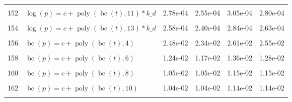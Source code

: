 \documentclass[12pt,a4paper]{article}
\DeclareMathOperator{\bc}{bc}
\DeclareMathOperator{\poly}{poly}
\begin{document}
\begin{longtable}[t]{ll>{\raggedleft\arraybackslash}p{2cm}>{\raggedleft\arraybackslash}p{2cm}>{\raggedleft\arraybackslash}p{2cm}>{\raggedleft\arraybackslash}p{2cm}}
\cellcolor{gray!6}{151} & \cellcolor{gray!6}{$\log(p) = c + \poly\left( \bc(t), 10 \right) * k\_d$} & \cellcolor{gray!6}{2.55e-04} & \cellcolor{gray!6}{2.34e-04} & \cellcolor{gray!6}{2.80e-04} & \cellcolor{gray!6}{2.56e-04}\\
152 & $\log(p) = c + \poly\left( \bc(t), 11 \right) * k\_d$ & 2.78e-04 & 2.55e-04 & 3.05e-04 & 2.80e-04\\
\cellcolor{gray!6}{153} & \cellcolor{gray!6}{$\log(p) = c + \poly\left( \bc(t), 12 \right) * k\_d$} & \cellcolor{gray!6}{2.88e-04} & \cellcolor{gray!6}{2.59e-04} & \cellcolor{gray!6}{3.17e-04} & \cellcolor{gray!6}{2.84e-04}\\
154 & $\log(p) = c + \poly\left( \bc(t), 13 \right) * k\_d$ & 2.58e-04 & 2.40e-04 & 2.84e-04 & 2.63e-04\\
\cellcolor{gray!6}{155} & \cellcolor{gray!6}{$\bc(p) = c + \poly\left( \bc(t), 3 \right)$} & \cellcolor{gray!6}{5.55e-02} & \cellcolor{gray!6}{2.01e-02} & \cellcolor{gray!6}{2.21e-02} & \cellcolor{gray!6}{2.12e-02}\\
156 & $\bc(p) = c + \poly\left( \bc(t), 4 \right)$ & 2.48e-02 & 2.34e-02 & 2.61e-02 & 2.55e-02\\
\cellcolor{gray!6}{157} & \cellcolor{gray!6}{$\bc(p) = c + \poly\left( \bc(t), 5 \right)$} & \cellcolor{gray!6}{1.38e-02} & \cellcolor{gray!6}{1.38e-02} & \cellcolor{gray!6}{1.43e-02} & \cellcolor{gray!6}{1.43e-02}\\
158 & $\bc(p) = c + \poly\left( \bc(t), 6 \right)$ & 1.24e-02 & 1.17e-02 & 1.36e-02 & 1.28e-02\\
\cellcolor{gray!6}{159} & \cellcolor{gray!6}{$\bc(p) = c + \poly\left( \bc(t), 7 \right)$} & \cellcolor{gray!6}{1.13e-02} & \cellcolor{gray!6}{1.08e-02} & \cellcolor{gray!6}{1.20e-02} & \cellcolor{gray!6}{1.18e-02}\\
160 & $\bc(p) = c + \poly\left( \bc(t), 8 \right)$ & 1.05e-02 & 1.05e-02 & 1.15e-02 & 1.15e-02\\
\cellcolor{gray!6}{161} & \cellcolor{gray!6}{$\bc(p) = c + \poly\left( \bc(t), 9 \right)$} & \cellcolor{gray!6}{1.06e-02} & \cellcolor{gray!6}{1.05e-02} & \cellcolor{gray!6}{1.16e-02} & \cellcolor{gray!6}{1.16e-02}\\
162 & $\bc(p) = c + \poly\left( \bc(t), 10 \right)$ & 1.04e-02 & 1.04e-02 & 1.14e-02 & 1.14e-02\\
\cellcolor{gray!6}{163} & \cellcolor{gray!6}{$\bc(p) = c + \poly\left( \bc(t), 11 \right)$} & \cellcolor{gray!6}{1.04e-02} & \cellcolor{gray!6}{1.04e-02} & \cellcolor{gray!6}{1.14e-02} & \cellcolor{gray!6}{1.14e-02}\\

\end{longtable}
\end{document}
